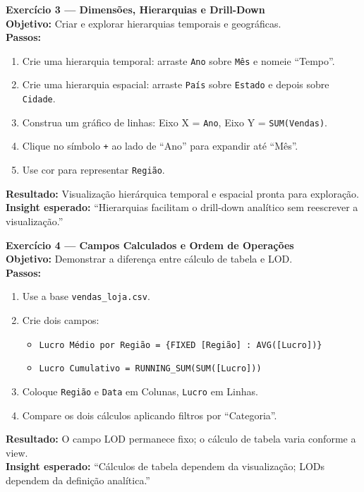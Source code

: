 \begin{SolvedBox}
\textbf{Exercício 3 — Dimensões, Hierarquias e Drill-Down}\\[4pt]
\textbf{Objetivo:} Criar e explorar hierarquias temporais e geográficas.\\[4pt]
\textbf{Passos:}
\begin{enumerate}[leftmargin=*]
  \item Crie uma hierarquia temporal: arraste \texttt{Ano} sobre \texttt{Mês} e nomeie “Tempo”.
  \item Crie uma hierarquia espacial: arraste \texttt{País} sobre \texttt{Estado} e depois sobre \texttt{Cidade}.
  \item Construa um gráfico de linhas: Eixo X = \texttt{Ano}, Eixo Y = \texttt{SUM(Vendas)}.
  \item Clique no símbolo \texttt{+} ao lado de “Ano” para expandir até “Mês”.
  \item Use cor para representar \texttt{Região}.
\end{enumerate}
\textbf{Resultado:} Visualização hierárquica temporal e espacial pronta para exploração.\\
\textbf{Insight esperado:} “Hierarquias facilitam o drill-down analítico sem reescrever a visualização.”
\end{SolvedBox}


\begin{SolvedBox}
\textbf{Exercício 4 — Campos Calculados e Ordem de Operações}\\[4pt]
\textbf{Objetivo:} Demonstrar a diferença entre cálculo de tabela e LOD.\\[4pt]
\textbf{Passos:}
\begin{enumerate}[leftmargin=*]
  \item Use a base \texttt{vendas\_loja.csv}.
  \item Crie dois campos:
  \begin{itemize}
    \item \texttt{Lucro Médio por Região = \{FIXED [Região] : AVG([Lucro])\}}
    \item \texttt{Lucro Cumulativo = RUNNING_SUM(SUM([Lucro]))}
  \end{itemize}
  \item Coloque \texttt{Região} e \texttt{Data} em Colunas, \texttt{Lucro} em Linhas.
  \item Compare os dois cálculos aplicando filtros por “Categoria”.
\end{enumerate}
\textbf{Resultado:} O campo LOD permanece fixo; o cálculo de tabela varia conforme a view.\\
\textbf{Insight esperado:} “Cálculos de tabela dependem da visualização; LODs dependem da definição analítica.”
\end{SolvedBox}


